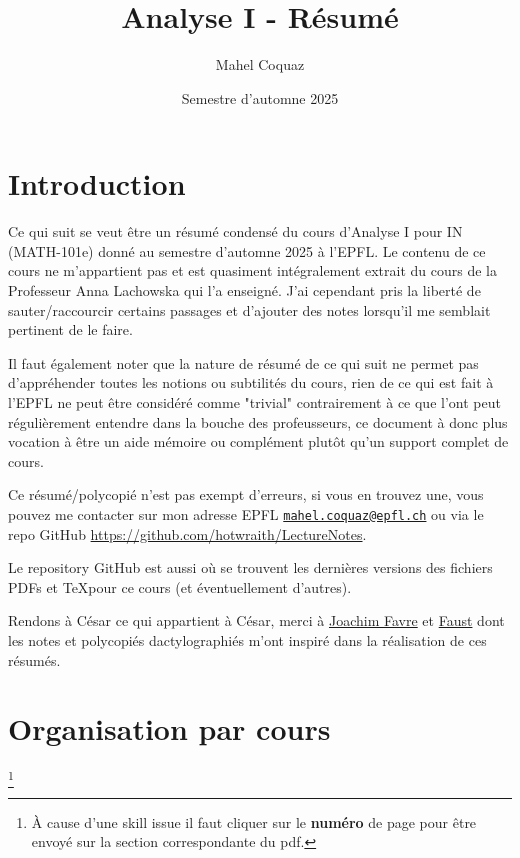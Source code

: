 \documentclass[10pt,a4paper]{book}
\title{Analyse I \vspace{0.2cm} - Résumé}
\author{Mahel Coquaz}
\date{Semestre d'automne 2025}
\begin{document}
\maketitle
\tableofcontents
\newpage
\listoflectures
\newpage

\section*{Introduction}

Ce qui suit se veut être un résumé condensé du cours d'Analyse I pour IN (MATH-101e) donné au semestre d'automne 2025 à l'EPFL. Le contenu de ce cours ne m'appartient pas et est quasiment intégralement extrait du cours de la Professeur Anna Lachowska qui l'a enseigné. J'ai cependant pris la liberté de sauter/raccourcir certains passages et d'ajouter des notes lorsqu'il me semblait pertinent de le faire. \par
Il faut également noter que la nature de résumé de ce qui suit ne permet pas d'appréhender toutes les notions ou subtilités du cours, rien de ce qui est fait à l'EPFL ne peut être considéré comme "trivial" contrairement à ce que l'ont peut régulièrement entendre dans la bouche des profeusseurs, ce document à donc plus vocation à être un aide mémoire ou complément plutôt qu'un support complet de cours.  \par
Ce résumé/polycopié n'est pas exempt d'erreurs, si vous en trouvez une, vous pouvez me contacter sur mon adresse EPFL \texttt{\href{mailto:mahel.coquaz@epfl.ch}{mahel.coquaz@epfl.ch}} ou via le repo GitHub \url{https://github.com/hotwraith/LectureNotes}. \par
Le repository GitHub est aussi où se trouvent les dernières versions des fichiers PDFs et \TeX pour ce cours (et éventuellement d'autres). 
\linebreak
\par 
Rendons à César ce qui appartient à César, merci à \href{https://github.com/JoachimFavre}{Joachim Favre} et \href{https://github.com/FocusedFaust}{Faust} dont les notes et polycopiés dactylographiés m'ont inspiré dans la réalisation de ces résumés. %

\newpage

\section{Organisation par cours}\footnote{À cause d'une skill issue il faut cliquer sur le \textbf{numéro} de page pour être envoyé sur la section correspondante du pdf.}
\end{document}
